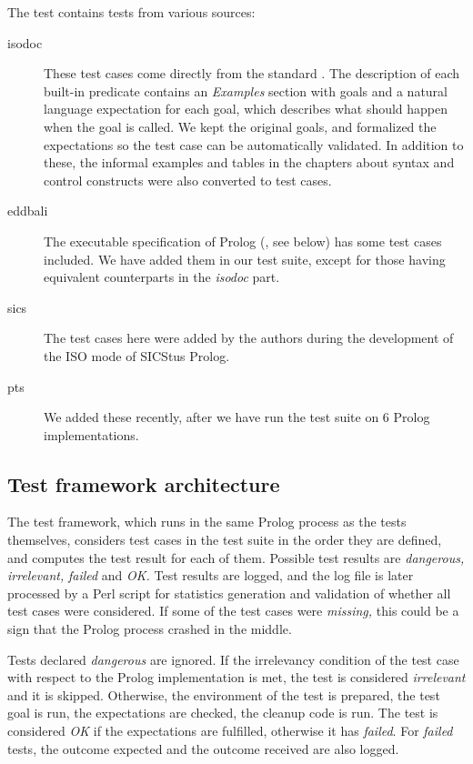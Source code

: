 \documentclass[draft]{llncs}%
\begin{document}
The test contains tests from various sources:

\begin{description}

\item[iso\textunderscore doc]
These test cases come directly from the
standard \cite{isoprolog95}. The description of each built-in predicate
contains an \emph{Examples} section with goals and a natural language
expectation for each goal, which describes what should happen when the goal
is called. We kept the original goals, and formalized the expectations so the
test case can be automatically validated.  In addition to these, the informal
examples and tables in the chapters about syntax and control constructs were
also converted to test cases.

\item[eddbali]
The executable specification of Prolog (\cite{executable}, see below) has
some test cases included. We have added them in our test suite, except
for those having equivalent counterparts in the \emph{iso\textunderscore doc}
part.

\item[sics]
The test cases here were added by the authors during the development of
the ISO mode of SICStus Prolog.

\item[pts]
We added these recently, after we have run the test suite on 6 Prolog
implementations.

\end{description}

\subsection{Test framework architecture}

The test framework, which runs in the same Prolog process as the tests
themselves, considers test cases in the test suite in the order
they are defined, and computes the test result for each of them. Possible test
results are \emph{dangerous,} \emph{irrelevant,} \emph{failed} and
\emph{OK.} Test results are logged, and the log file is later processed by a
Perl script for statistics generation and validation of whether all test cases
were considered. If some of the test cases were \emph{missing,} this could be
a sign that the Prolog process crashed in the middle.

Tests declared \emph{dangerous} are ignored. If the irrelevancy condition of
the test case with respect to the Prolog implementation is met, the test is
considered \emph{irrelevant} and it is skipped.
Otherwise, the environment of the test is prepared, the test goal is run, the
expectations are checked, the cleanup code is run. The test is considered
\emph{OK} if the expectations are fulfilled, otherwise it has \emph{failed}.
For \emph{failed} tests, the outcome expected and the outcome
received are also logged.
\end{document}
